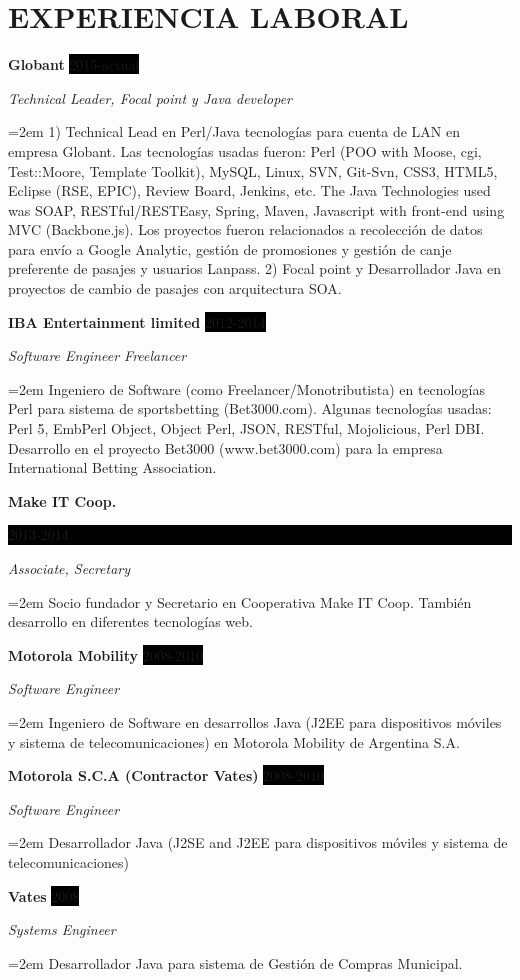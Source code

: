 \documentclass[paper=a4,fontsize=11pt]{scrartcl} %
\newcommand{\sepspace}{\vspace*{1em}}		%
\newcommand{\NewPart}[1]{\section*{\uppercase{#1}}}
\newcommand{\EducationEntry}[4]{
		\noindent \textbf{#1} \hfill      %
		\colorbox{Black}{%
			\parbox{6em}{%
			\hfill\color{White}#2}} \par  %
		\noindent \textit{#3} \par        %
		\noindent\hangindent=2em\hangafter=0 \small #4 %
		\normalsize \par}
\newcommand{\WorkEntry}[4]{				  %
		\noindent \textbf{#1} \hfill      %
		\colorbox{Black}{\color{White}#2} \par  %
		\noindent \textit{#3} \par              %
		\noindent\hangindent=2em\hangafter=0 \small #4 %
		\normalsize \par}
\begin{document}
\NewPart{Experiencia laboral}{}

\WorkEntry{Globant}{2015-actual}{Technical Leader, Focal point y Java developer}
{1) Technical Lead en Perl/Java tecnologías para cuenta de LAN en empresa Globant. Las tecnologías usadas fueron: Perl (POO with Moose, cgi, Test::Moore, Template Toolkit), MySQL, Linux, SVN, Git-Svn, CSS3, HTML5, Eclipse (RSE, EPIC), Review Board, Jenkins, etc. The Java Technologies used was SOAP, RESTful/RESTEasy, Spring, Maven, Javascript with front-end using MVC (Backbone.js). Los proyectos fueron  relacionados a recolección de datos para envío a Google Analytic, gestión de promosiones y gestión de canje preferente de pasajes y usuarios Lanpass.
2) Focal point y Desarrollador Java en proyectos de cambio de pasajes con arquitectura SOA.}

\sepspace

\WorkEntry{IBA Entertainment limited}{2012-2014}{Software Engineer Freelancer}
{Ingeniero de Software (como Freelancer/Monotributista) en tecnologías Perl para sistema de sportsbetting (Bet3000.com). Algunas tecnologías usadas: Perl 5, EmbPerl Object, Object Perl, JSON, RESTful, Mojolicious, Perl DBI. Desarrollo en el proyecto Bet3000 (www.bet3000.com) para la empresa International Betting Association.}

\sepspace

\EducationEntry{Make IT Coop.}{2013-2014}{Associate, Secretary}{
Socio fundador y Secretario en Cooperativa Make IT Coop. También desarrollo en diferentes tecnologías web.}

\sepspace

\WorkEntry{Motorola Mobility}{2008-2010}{Software Engineer}
{Ingeniero de Software en desarrollos Java (J2EE para dispositivos móviles y sistema de telecomunicaciones) en Motorola Mobility de Argentina S.A.}

\sepspace

\WorkEntry{Motorola S.C.A (Contractor Vates)}{2008-2010}{Software Engineer}
{Desarrollador Java (J2SE and J2EE para dispositivos móviles y sistema de telecomunicaciones)}

\sepspace

\WorkEntry{Vates}{2008}{Systems Engineer}
{Desarrollador Java para sistema de Gestión de Compras Municipal.}
\end{document}
